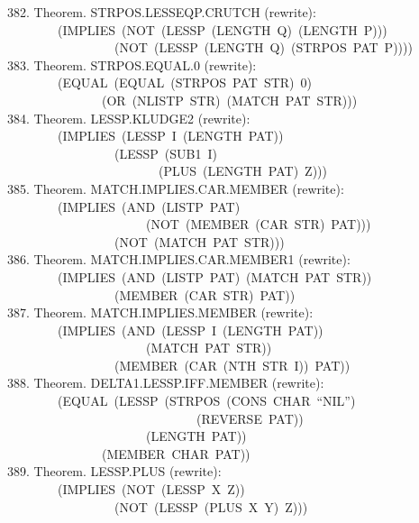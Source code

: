 \documentclass[10pt]{book}
\newenvironment{pubasis}{\begin{flushleft}}{\end{flushleft}}
\begin{document}
\begin{pubasis}
382.    Theorem.  STRPOS.LESSEQP.CRUTCH (rewrite):\\
~~~~~~~~(IMPLIES~(NOT~(LESSP~(LENGTH~Q)~(LENGTH~P)))\\
~~~~~~~~~~~~~~~~~(NOT~(LESSP~(LENGTH~Q)~(STRPOS~PAT~P))))\\

383.    Theorem.  STRPOS.EQUAL.0 (rewrite):\\
~~~~~~~~(EQUAL~(EQUAL~(STRPOS~PAT~STR)~0)\\
~~~~~~~~~~~~~~~(OR~(NLISTP~STR)~(MATCH~PAT~STR)))\\

384.    Theorem.  LESSP.KLUDGE2 (rewrite):\\
~~~~~~~~(IMPLIES~(LESSP~I~(LENGTH~PAT))\\
~~~~~~~~~~~~~~~~~(LESSP~(SUB1~I)\\
~~~~~~~~~~~~~~~~~~~~~~~~(PLUS~(LENGTH~PAT)~Z)))\\

385.    Theorem.  MATCH.IMPLIES.CAR.MEMBER (rewrite):\\
~~~~~~~~(IMPLIES~(AND~(LISTP~PAT)\\
~~~~~~~~~~~~~~~~~~~~~~(NOT~(MEMBER~(CAR~STR)~PAT)))\\
~~~~~~~~~~~~~~~~~(NOT~(MATCH~PAT~STR)))\\

386.    Theorem.  MATCH.IMPLIES.CAR.MEMBER1 (rewrite):\\
~~~~~~~~(IMPLIES~(AND~(LISTP~PAT)~(MATCH~PAT~STR))\\
~~~~~~~~~~~~~~~~~(MEMBER~(CAR~STR)~PAT))\\

387.    Theorem.  MATCH.IMPLIES.MEMBER (rewrite):\\
~~~~~~~~(IMPLIES~(AND~(LESSP~I~(LENGTH~PAT))\\
~~~~~~~~~~~~~~~~~~~~~~(MATCH~PAT~STR))\\
~~~~~~~~~~~~~~~~~(MEMBER~(CAR~(NTH~STR~I))~PAT))\\

388.    Theorem.  DELTA1.LESSP.IFF.MEMBER (rewrite):\\
~~~~~~~~(EQUAL~(LESSP~(STRPOS~(CONS~CHAR~``NIL'')\\
~~~~~~~~~~~~~~~~~~~~~~~~~~~~~~(REVERSE~PAT))\\
~~~~~~~~~~~~~~~~~~~~~~(LENGTH~PAT))\\
~~~~~~~~~~~~~~~(MEMBER~CHAR~PAT))\\

389.    Theorem.  LESSP.PLUS (rewrite):\\
~~~~~~~~(IMPLIES~(NOT~(LESSP~X~Z))\\
~~~~~~~~~~~~~~~~~(NOT~(LESSP~(PLUS~X~Y)~Z)))\\


\end{pubasis}
\end{document}
